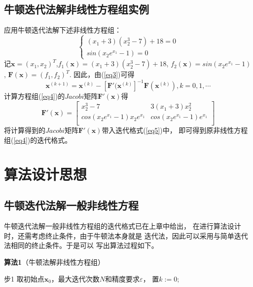 \documentclass[UTF8,a4paper,12pt]{ctexart}
\begin{document}
   \subsection{牛顿迭代法解非线性方程组实例}
   应用牛顿迭代法解下述非线性方程组：
   \begin{equation} \label{eq4}
	   \begin{cases}
		   ({x}_1+3)({x}_2^3-7)+18=0\\
		   sin({x}_2e^{{x}_1}-1)=0
	   \end{cases}	
   \end{equation}
   记$\boldsymbol{x}=(x_1,x_2)^{T}$,$f_1(\boldsymbol{x})=({x}_1+3)({x}_2^3-7)+18$,
   $f_2(\boldsymbol{x})=sin({x}_2e^{{x}_1}-1)$,
   $\boldsymbol{F}(\boldsymbol{x})=(f_1,f_2)^{T}$.
   因此，由(\ref{eq3})可得
   \begin{equation} \label{eq5}
	   \boldsymbol{x}^{(k+1)}=\boldsymbol{x}^{(k)}-[\boldsymbol{F}'(\boldsymbol{x}^{(k)}]^{-1}
	   \boldsymbol{F}(\boldsymbol{x}^{(k)}),k=0,1,\cdots
   \end{equation}
   计算方程组(\ref{eq4})的$Jacobi$矩阵$\boldsymbol{F}'(\boldsymbol{x})$得
   \begin{displaymath}
	   \boldsymbol{F}'(\boldsymbol{x})=\begin{bmatrix}
		   x_2^3-7
		   & 3(x_1+3)x_2^2\\
		   
		   cos(x_2e^{x_1}-1)x_2e^{x_1}
		   & cos(x_2e^{x_1}-1)e^{x_1}\\
	   \end{bmatrix}
   \end{displaymath}
   将计算得到的$Jacobi$矩阵$\boldsymbol{F}'(\boldsymbol{x})$带入迭代格式(\ref{eq5})中，
   即可得到原非线性方程组(\ref{eq4})的迭代格式。

   \section{算法设计思想} 
   \subsection{牛顿迭代法解一般非线性方程}
   牛顿迭代法解一般非线性方程组的迭代格式已在上章中给出，
   在进行算法设计时，还需考虑终止条件，由于牛顿法本身就是
   迭代法，因此可以采用与简单迭代法相同的终止条件。于是可以
   写出算法过程如下。
   
   \textbf{算法1}（牛顿法解非线性方程组）
   
   步1 \;取初始点$\boldsymbol{x}_0$，最大迭代次数$N$和精度要求$\varepsilon$，
   置$k:=0$;
   
\end{document}
